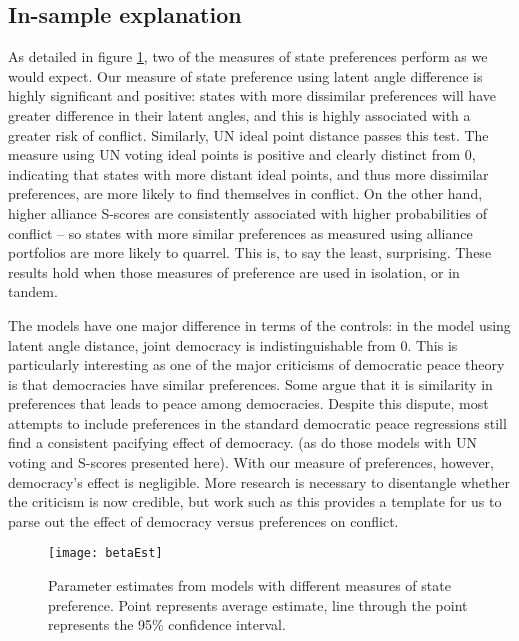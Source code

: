 \subsection*{In-sample explanation}

As detailed in figure \ref{fig:coefP}, two of the measures of state preferences perform as we would expect. Our measure of state preference using latent angle difference is highly significant and positive: states with more dissimilar preferences will have greater difference in their latent angles, and this is highly associated with a greater risk of conflict. Similarly, UN ideal point distance passes this test. The measure using UN voting ideal points is positive and clearly distinct from $0$, indicating that states with more distant ideal points, and thus more dissimilar preferences, are more likely to find themselves in conflict. On the other hand, higher alliance S-scores are consistently associated with higher probabilities of conflict -- so states with more similar preferences as measured using alliance portfolios are more likely to quarrel. This is, to say the least, surprising. These results hold when those measures of preference are used in isolation, or in tandem.

The models have one major difference in terms of the controls: in the model using latent angle distance, joint democracy is indistinguishable from $0$. This is particularly interesting as one of the major criticisms of democratic peace theory is that democracies have similar preferences. Some argue that it is similarity in preferences that leads to peace among democracies.  Despite this dispute, most attempts to include preferences in the standard democratic peace regressions still find a consistent pacifying effect of democracy.
(as do those models with UN voting and S-scores presented here). With our measure of preferences, however, democracy's effect is negligible. More research is necessary to disentangle whether the criticism is now credible, but work such as this provides a template for us to parse out the effect of democracy versus preferences on conflict.


\begin{figure}[ht]
	\centering
	\texttt{[image: betaEst]}
	\caption{Parameter estimates from models with different measures of state preference. Point represents average estimate, line through the point represents the 95\% confidence interval.}
	\label{fig:coefP}
\end{figure}
\FloatBarrier

